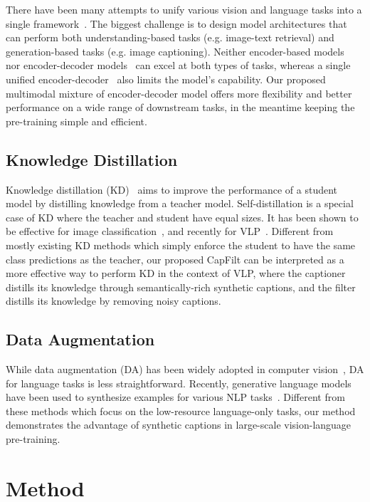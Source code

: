 There have been many attempts to unify various vision and language tasks into a single framework~\cite{VLP,VL_T5,simvlm}. The biggest challenge is to design model architectures that can perform both understanding-based tasks (e.g. image-text retrieval) and generation-based tasks (e.g. image captioning). Neither encoder-based models~\cite{ALBEF,unimo,clip} nor encoder-decoder models~\cite{VL_T5,simvlm} can excel at both types of tasks, whereas a single unified encoder-decoder~\cite{VLP} also limits the model's capability. Our proposed multimodal mixture of encoder-decoder model offers more flexibility and better performance on a wide range of downstream tasks, in the meantime keeping the pre-training simple and efficient.

\subsection{Knowledge Distillation}

Knowledge distillation (KD)~\cite{kd_hinton} aims to improve the performance of a student model by distilling knowledge from a teacher model. Self-distillation is a special case of KD where the teacher and student have equal sizes. It has been shown to be effective for image classification~\cite{noisy_student}, and recently for VLP~\cite{ALBEF}. Different from mostly existing KD methods which simply enforce the student to have the same class predictions as the teacher, our proposed CapFilt can be interpreted as a more effective way to perform KD in the context of VLP, where the captioner distills its knowledge through semantically-rich synthetic captions, and the filter distills its knowledge by removing noisy captions.

\subsection{Data Augmentation}

While data augmentation (DA) has been widely adopted in computer vision~\cite{DA_survey}, DA for language tasks is less straightforward. Recently, generative language models have been used to synthesize examples for various NLP tasks~\cite{DA,DA_AAAI,DA_QA,DA_commonsense}. Different from these methods which focus on the low-resource language-only tasks, our method demonstrates the advantage of synthetic captions in large-scale vision-language pre-training.

\section{Method}

